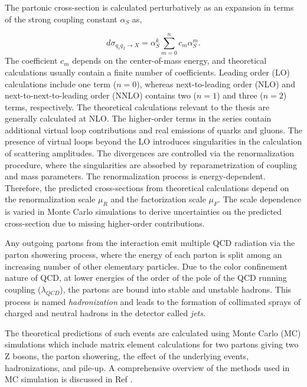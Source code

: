 The partonic cross-section is calculated perturbatively as an expansion in terms of the strong coupling constant $\alpha_{S}$ as,

\begin{equation}
\label{eqn:PartonicXS}
d\sigma_{q_{1}q_{2}\rightarrow X} = \alpha_{S}^{k} \sum_{m=0}^{n} c_{m}\alpha_{S}^{m}.
\end{equation}
The coefficient $c_{m}$ depends on the center-of-mass energy, and theoretical calculations usually contain a finite number of coefficients. Leading order (LO) calculations include one term ($n=0$), whereas next-to-leading order (NLO) and next-to-next-to-leading order (NNLO) contains two ($n=1$) and three ($n=2$) terms, respectively. The theoretical calculations relevant to the thesis are generally calculated at NLO. The higher-order terms in the series contain additional virtual loop contributions and real emissions of quarks and gluons. The presence of virtual loops beyond the LO introduces singularities in the calculation of scattering amplitudes. The divergences are controlled via the renormalization procedure, where the singularities are absorbed by reparametrization of coupling and mass parameters. The renormalization process is energy-dependent. Therefore, the predicted cross-sections from theoretical calculations depend on the renormalization scale $\mu_{R}$ and the factorization scale $\mu_{F}$. The scale dependence is varied in Monte Carlo simulations to derive uncertainties on the predicted cross-section due to missing higher-order contributions. 

Any outgoing partons from the interaction emit multiple QCD radiation via the parton showering process, where the energy of each parton is split among an increasing number of other elementary particles. Due to the color confinement nature of QCD, at lower energies of the order of the pole of the QCD running coupling ($\lambda_{QCD}$), the partons are bound into stable and unstable hadrons. This process is named \textit{hadronization} and leads to the formation of collimated sprays of charged and neutral hadrons in the detector called \textit{jets}.

The theoretical predictions of such events are calculated using Monte Carlo (MC) simulations which include matrix element calculations for two partons giving two Z bosons, the parton showering, the effect of the underlying events, hadronizations, and pile-up. A comprehensive overview of the methods used in MC simulation is discussed in Ref \cite{EventGenerator}.  
